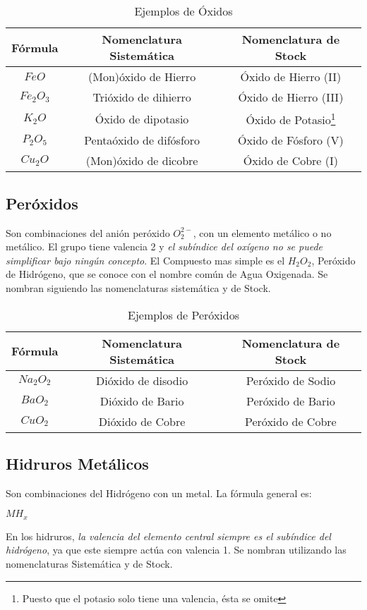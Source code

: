 \begin{table}[h!]
	\centering
	\begin{tabular}{c|cc}
		Fórmula&Nomenclatura Sistemática&Nomenclatura de Stock\\ \hline
		$FeO$&(Mon)óxido de Hierro&Óxido de Hierro (II)\\
		$Fe_{2}O_{3}$&Trióxido de dihierro&Óxido de Hierro (III)\\
		$K_{2}O$&Óxido de dipotasio&Óxido de Potasio\footnote{Puesto que el potasio solo tiene una valencia, ésta se omite }\\
		$P_{2}O_{5}$&Pentaóxido de difósforo&Óxido de Fósforo (V)\\
		$Cu_{2}O$&(Mon)óxido de dicobre&Óxido de Cobre (I)\\ \hline
	\end{tabular}
	\caption{Ejemplos de Óxidos}
\end{table}

\subsection{Peróxidos}
Son combinaciones del anión peróxido $O^{2-}_2$, con un elemento metálico o no metálico. El grupo tiene valencia 2 y \emph{el subíndice del oxígeno no se puede simplificar bajo ningún concepto}. El Compuesto mas simple es el $H_2O_2$, Peróxido de Hidrógeno, que se conoce con el nombre común de Agua Oxigenada. Se nombran siguiendo las nomenclaturas sistemática y de Stock. 
\begin{table}[h!]
	\centering
	\begin{tabular}{c|cc}
		Fórmula&Nomenclatura Sistemática&Nomenclatura de Stock\\ \hline
		$Na_{2}O_{2}$&Dióxido de disodio&Peróxido de Sodio\\ 
		$BaO_{2}$&Dióxido de Bario&Peróxido de Bario\\
		$CuO_{2}$&Dióxido de Cobre&Peróxido de Cobre\\ \hline
	\end{tabular}
	\caption{Ejemplos de Peróxidos}
\end{table}

\subsection{Hidruros Metálicos}
Son combinaciones del Hidrógeno con un metal. La fórmula general es:\\
\begin{center}
	$MH_x$
\end{center}
En los hidruros, \emph{la valencia del elemento central siempre es el subíndice del hidrógeno}, ya que este siempre actúa con valencia 1. Se nombran utilizando las nomenclaturas Sistemática y de Stock.

